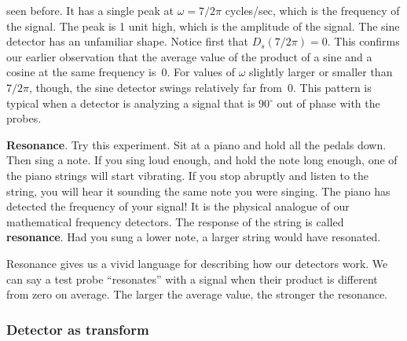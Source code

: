 {{{{\vspace{70pt}

	
\vspace{180pt}

\noindent
seen before.\label{cos7t}  It has a single peak at $\omega = 7/2\pi$ cycles/sec, which is the frequency of the signal.  The peak is 1 unit high, which is the amplitude of the signal.  The sine detector has an unfamiliar shape.  Notice first that $D_s(7/2\pi) = 0$.  This confirms our earlier observation that the average value of the product of a sine and a cosine at the same frequency is~0.  For values of $\omega$ slightly larger or smaller than $7/2\pi$, though, the sine detector swings relatively far from~0.  This pattern is typical when a detector is analyzing a signal that is 90$^\circ$ out of phase with the probes.      
\medskip




{\bf Resonance}.  Try this experiment.  Sit at a piano and hold all the pedals down.  Then sing a note.  If you sing loud enough, and hold the note long enough, one of the piano strings will start vibrating.  If you stop abruptly and listen to the string, you will hear it sounding the same note you were singing.   
The piano has detected the frequency of your signal!  It is the physical analogue of our mathematical frequency detectors.  The response of the string is called {\bf resonance}.  Had you sung a lower note, a larger string would have resonated.  

	Resonance gives us a  vivid language for describing how our detectors work.  We can say a test probe ``resonates'' with a signal when their product is different from zero on average.  The larger the average value, the stronger the resonance.



\subsubsection{Detector as transform}

}}}}

